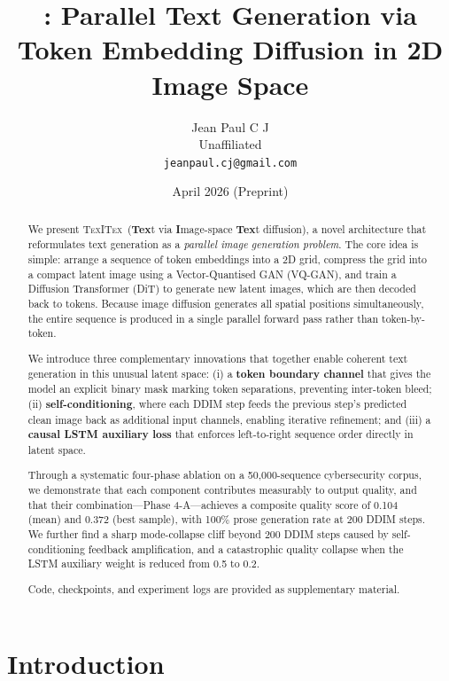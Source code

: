 \documentclass[11pt,a4paper]{article}
\title{
  \texitex: Parallel Text Generation via\\
  Token Embedding Diffusion in 2D Image Space
}
\author{
  Jean Paul C J\\
  Unaffiliated\\
  \texttt{jeanpaul.cj@gmail.com}
}
\date{April 2026 \quad (Preprint)}
\newcommand{\texitex}{\textsc{TexITex}}
\begin{document}
\maketitle

\begin{abstract}
We present \texitex\ (\textbf{Tex}t via \textbf{I}mage-space \textbf{Tex}t diffusion),
a novel architecture that reformulates text generation as a \emph{parallel image
generation problem}. The core idea is simple: arrange a sequence of token embeddings
into a 2D grid, compress the grid into a compact latent image using a Vector-Quantised
GAN (VQ-GAN), and train a Diffusion Transformer (DiT) to generate new latent images,
which are then decoded back to tokens. Because image diffusion generates all spatial
positions simultaneously, the entire sequence is produced in a single parallel forward
pass rather than token-by-token.

We introduce three complementary innovations that together enable coherent text generation
in this unusual latent space: (i) a \textbf{token boundary channel} that gives the
model an explicit binary mask marking token separations, preventing inter-token bleed;
(ii) \textbf{self-conditioning}, where each DDIM step feeds the previous step's predicted
clean image back as additional input channels, enabling iterative refinement; and
(iii) a \textbf{causal LSTM auxiliary loss} that enforces left-to-right sequence order
directly in latent space.

Through a systematic four-phase ablation on a 50{,}000-sequence cybersecurity corpus,
we demonstrate that each component contributes measurably to output quality, and that
their combination---Phase 4-A---achieves a composite quality score of 0.104 (mean) and
0.372 (best sample), with 100\% prose generation rate at 200 DDIM steps.
We further find a sharp mode-collapse cliff beyond 200 DDIM steps caused by
self-conditioning feedback amplification, and a catastrophic quality collapse when the
LSTM auxiliary weight is reduced from 0.5 to 0.2.

Code, checkpoints, and experiment logs are provided as supplementary material.
\end{abstract}

\section{Introduction}
\label{sec:intro}
\end{document}
